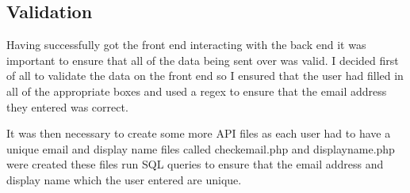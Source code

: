 \subsection{Validation}
Having successfully got the front end interacting with the back end it was important to ensure that all of the data being sent over was valid. I decided first of all to validate the data on the front end so I ensured that the user had filled in all of the appropriate boxes and used a regex to ensure that the email address they entered was correct.

It was then necessary to create some more API files as each user had to have a unique email and display name files called checkemail.php and displayname.php were created these files run SQL queries to ensure that the email address and display name which the user entered are unique.

